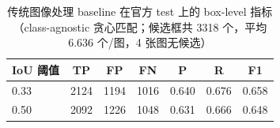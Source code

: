 \begin{table}[t]
\centering
\caption{传统图像处理 baseline 在官方 test 上的 box-level 指标（class-agnostic 贪心匹配；候选框共 3318 个，平均 6.636 个/图，4 张图无候选）}
\label{tab:ip_metrics}
\small
\setlength{\tabcolsep}{3pt}
\begin{tabular}{lcccccc}
\toprule
IoU 阈值 & TP & FP & FN & P & R & F1 \\
\midrule
0.33 & 2124 & 1194 & 1016 & 0.640 & 0.676 & 0.658 \\
0.50 & 2092 & 1226 & 1048 & 0.631 & 0.666 & 0.648 \\
\bottomrule
\end{tabular}
\end{table}
